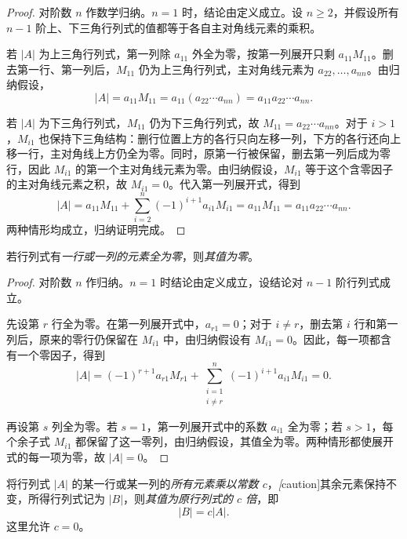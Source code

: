 \begin{proof}
对阶数 $n$ 作数学归纳。$n=1$ 时，结论由定义成立。设 $n\geq 2$，并假设所有 $n-1$ 阶上、下三角行列式的值都等于各自主对角线元素的乘积。

若 $|A|$ 为上三角行列式，第一列除 $a_{11}$ 外全为零，按第一列展开只剩 $a_{11}M_{11}$。删去第一行、第一列后，$M_{11}$ 仍为上三角行列式，主对角线元素为 $a_{22},\ldots,a_{nn}$。由归纳假设，
\[
    |A|=a_{11}M_{11}
        =a_{11}(a_{22}\cdots a_{nn})
        =a_{11}a_{22}\cdots a_{nn}.
\]

若 $|A|$ 为下三角行列式，$M_{11}$ 仍为下三角行列式，故 $M_{11}=a_{22}\cdots a_{nn}$。对于 $i>1$，$M_{i1}$ 也保持下三角结构：删行位置上方的各行只向左移一列，下方的各行还向上移一行，主对角线上方仍全为零。同时，原第一行被保留，删去第一列后成为零行，因此 $M_{i1}$ 的第一个主对角线元素为零。由归纳假设，$M_{i1}$ 等于这个含零因子的主对角线元素之积，故 $M_{i1}=0$。代入第一列展开式，得到
\[
    |A|=a_{11}M_{11}+\sum_{i=2}^{n}(-1)^{i+1}a_{i1}M_{i1}
        =a_{11}M_{11}
        =a_{11}a_{22}\cdots a_{nn}.
\]
两种情形均成立，归纳证明完成。
\end{proof}

\begin{property}[零行或零列]
\label{prop:determinant-zero-line}
若行列式有\emph{一行或一列的元素全为零}，则\emph{其值为零}。
\end{property}

\begin{proof}
对阶数 $n$ 作归纳。$n=1$ 时结论由定义成立，设结论对 $n-1$ 阶行列式成立。

先设第 $r$ 行全为零。在第一列展开式中，$a_{r1}=0$；对于 $i\ne r$，删去第 $i$ 行和第一列后，原来的零行仍保留在 $M_{i1}$ 中，由归纳假设有 $M_{i1}=0$。因此，每一项都含有一个零因子，得到
\[
    |A|=(-1)^{r+1}a_{r1}M_{r1}
        +\sum_{\substack{i=1\\i\ne r}}^{n}(-1)^{i+1}a_{i1}M_{i1}=0.
\]

再设第 $s$ 列全为零。若 $s=1$，第一列展开式中的系数 $a_{i1}$ 全为零；若 $s>1$，每个余子式 $M_{i1}$ 都保留了这一零列，由归纳假设，其值全为零。两种情形都使展开式的每一项为零，故 $|A|=0$。
\end{proof}

\begin{property}[一行或一列的常数因子]
\label{prop:determinant-scaling}
将行列式 $|A|$ 的某一行或某一列的\emph{所有元素乘以常数 $c$}，\emph[caution]{其余元素保持不变}，所得行列式记为 $|B|$，则\emph{其值为原行列式的 $c$ 倍}，即
\[
    |B|=c|A|.
\]
这里允许 $c=0$。
\end{property}

